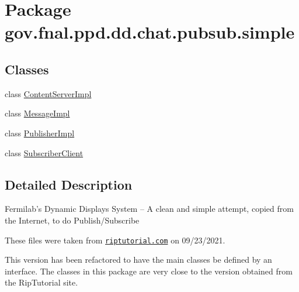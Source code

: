 \hypertarget{namespacegov_1_1fnal_1_1ppd_1_1dd_1_1chat_1_1pubsub_1_1simple}{\section{Package gov.\-fnal.\-ppd.\-dd.\-chat.\-pubsub.\-simple}
\label{namespacegov_1_1fnal_1_1ppd_1_1dd_1_1chat_1_1pubsub_1_1simple}
}
\subsection*{Classes}
\begin{DoxyCompactItemize}
\item 
class \hyperlink{classgov_1_1fnal_1_1ppd_1_1dd_1_1chat_1_1pubsub_1_1simple_1_1ContentServerImpl}{Content\-Server\-Impl}
\item 
class \hyperlink{classgov_1_1fnal_1_1ppd_1_1dd_1_1chat_1_1pubsub_1_1simple_1_1MessageImpl}{Message\-Impl}
\item 
class \hyperlink{classgov_1_1fnal_1_1ppd_1_1dd_1_1chat_1_1pubsub_1_1simple_1_1PublisherImpl}{Publisher\-Impl}
\item 
class \hyperlink{classgov_1_1fnal_1_1ppd_1_1dd_1_1chat_1_1pubsub_1_1simple_1_1SubscriberClient}{Subscriber\-Client}
\end{DoxyCompactItemize}


\subsection{Detailed Description}
Fermilab's Dynamic Displays System -- A clean and simple attempt, copied from the Internet, to do Publish/\-Subscribe 

These files were taken from \href{https://riptutorial.com/design-patterns/example/6498/publish-subscribe-in-java}{\tt riptutorial.\-com} on 09/23/2021. 

This version has been refactored to have the main classes be defined by an interface. The classes in this package are very close to the version obtained from the Rip\-Tutorial site. 